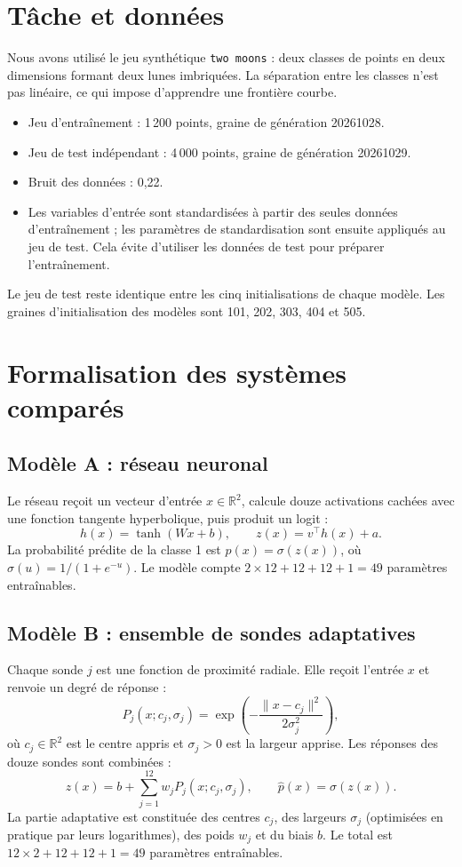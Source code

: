\documentclass[11pt,a4paper]{article}
\begin{document}
\section{Tâche et données}
Nous avons utilisé le jeu synthétique \texttt{two moons} : deux classes de points en deux dimensions formant deux lunes imbriquées. La séparation entre les classes n'est pas linéaire, ce qui impose d'apprendre une frontière courbe.

\begin{itemize}[leftmargin=1.5em]
  \item Jeu d'entraînement : 1\,200 points, graine de génération 20261028.
  \item Jeu de test indépendant : 4\,000 points, graine de génération 20261029.
  \item Bruit des données : 0,22.
  \item Les variables d'entrée sont standardisées à partir des seules données d'entraînement ; les paramètres de standardisation sont ensuite appliqués au jeu de test. Cela évite d'utiliser les données de test pour préparer l'entraînement.
\end{itemize}
Le jeu de test reste identique entre les cinq initialisations de chaque modèle. Les graines d'initialisation des modèles sont 101, 202, 303, 404 et 505.

\section{Formalisation des systèmes comparés}
\subsection{Modèle A : réseau neuronal}
Le réseau reçoit un vecteur d'entrée $x\in\mathbb{R}^2$, calcule douze activations cachées avec une fonction tangente hyperbolique, puis produit un logit :
\[
 h(x)=\tanh(Wx+b),\qquad z(x)=v^\top h(x)+a.
\]
La probabilité prédite de la classe 1 est $\hat p(x)=\sigma(z(x))$, où $\sigma(u)=1/(1+e^{-u})$. Le modèle compte $2\times12+12+12+1=49$ paramètres entraînables.

\subsection{Modèle B : ensemble de sondes adaptatives}
Chaque sonde $j$ est une fonction de proximité radiale. Elle reçoit l'entrée $x$ et renvoie un degré de réponse :
\[
 P_j(x;c_j,\sigma_j)=\exp\!\left(-\frac{\lVert x-c_j\rVert^2}{2\sigma_j^2}\right),
\]
où $c_j\in\mathbb{R}^2$ est le centre appris et $\sigma_j>0$ est la largeur apprise. Les réponses des douze sondes sont combinées :
\[
 z(x)=b+\sum_{j=1}^{12} w_j P_j(x;c_j,\sigma_j),
 \qquad \hat p(x)=\sigma(z(x)).
\]
La partie adaptative est constituée des centres $c_j$, des largeurs $\sigma_j$ (optimisées en pratique par leurs logarithmes), des poids $w_j$ et du biais $b$. Le total est $12\times2+12+12+1=49$ paramètres entraînables.
\end{document}
